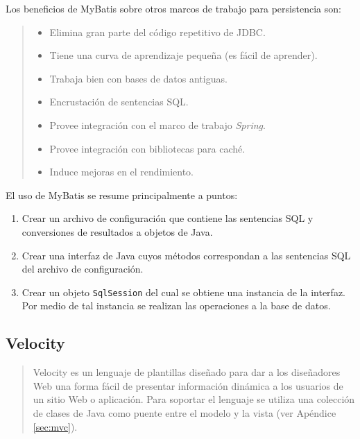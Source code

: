 Los beneficios de MyBatis sobre otros marcos de trabajo para persistencia son\cite{PersistenceWithMyBatis}:
\begin{quote}
	\begin{itemize}
		\item Elimina gran parte del código repetitivo de JDBC.
		\item Tiene una curva de aprendizaje pequeña (es fácil de aprender).
		\item Trabaja bien con bases de datos antiguas.
		\item Encrustación de sentencias SQL.
		\item Provee integración con el marco de trabajo \textit{Spring}.
		\item Provee integración con bibliotecas para caché.
		\item Induce mejoras en el rendimiento.
	\end{itemize}
\end{quote}

El uso de MyBatis se resume principalmente a puntos\cite{PersistenceWithMyBatis}:
\begin{enumerate}
	\item Crear un archivo de configuración que contiene las sentencias SQL y conversiones de resultados a objetos de Java.
	\item Crear una interfaz de Java cuyos métodos correspondan a las sentencias SQL del archivo de configuración.
	\item Crear un objeto \texttt{SqlSession} del cual se obtiene una instancia de la interfaz. Por medio de tal instancia se realizan las operaciones a la base de datos.
\end{enumerate}

\subsection{Velocity}\label{sec:velocity}
\begin{quote}
	Velocity es un lenguaje de plantillas diseñado para dar a los diseñadores Web una forma fácil de presentar información dinámica a los usuarios de un sitio Web o aplicación. Para soportar el lenguaje se utiliza una colección de clases de Java como puente entre el modelo y la vista\cite{MasteringApacheVelocity} (ver Apéndice \ref{sec:mvc}).
\end{quote}

